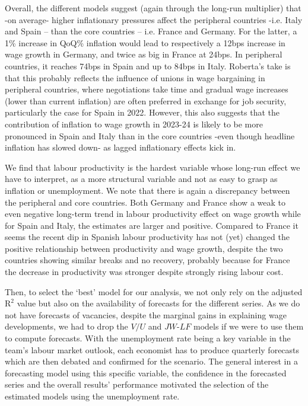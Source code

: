 Overall, the different models suggest (again through the long-run multiplier) that -on average- higher inflationary pressures affect the peripheral countries -i.e. Italy and Spain – than the core countries – i.e. France and Germany. 
For the latter, a 1\% increase in QoQ\% inflation would lead to respectively a 12bps increase in wage growth in Germany, and twice as big in France at 24bps. 
In peripheral countries, it reaches 74bps in Spain and up to 84bps in Italy. 
Roberta’s take is that this probably reflects the influence of unions in wage bargaining in peripheral countries, where negotiations take time and gradual wage increases (lower than current inflation) are often preferred in exchange for job security, particularly the case for Spain in 2022. 
However, this also suggests that the contribution of inflation to wage growth in 2023-24 is likely to be more pronounced in Spain and Italy than in the core countries -even though headline inflation has slowed down- as lagged inflationary effects kick in.

We find that labour productivity is the hardest variable whose long-run effect we have to interpret, as a more structural variable and not as easy to grasp as inflation or unemployment. 
We note that there is again a discrepancy between the peripheral and core countries. 
Both Germany and France show a weak to even negative long-term trend in labour productivity effect on wage growth while for Spain and Italy, the estimates are larger and positive. 
Compared to France it seems the recent dip in Spanish labour productivity has not (yet) changed the positive relationship between productivity and wage growth, despite the two countries showing similar breaks and no recovery, probably because for France the decrease in productivity was stronger despite strongly rising labour cost.

Then, to select the ‘best’ model for our analysis, we not only rely on the adjusted $\textrm{R}^{2}$ value but also on the availability of forecasts for the different series. 
As we do not have forecasts of vacancies, despite the marginal gains in explaining wage developments, we had to drop the $V/U$ and $JW\textrm{-}LF$ models if we were to use them to compute forecasts. 
With the unemployment rate being a key variable in the team’s labour market outlook, each economist has to produce quarterly forecasts which are then debated and confirmed for the scenario. 
The general interest in a forecasting model using this specific variable, the confidence in the forecasted series and the overall results’ performance motivated the selection of the estimated models using the unemployment rate.

